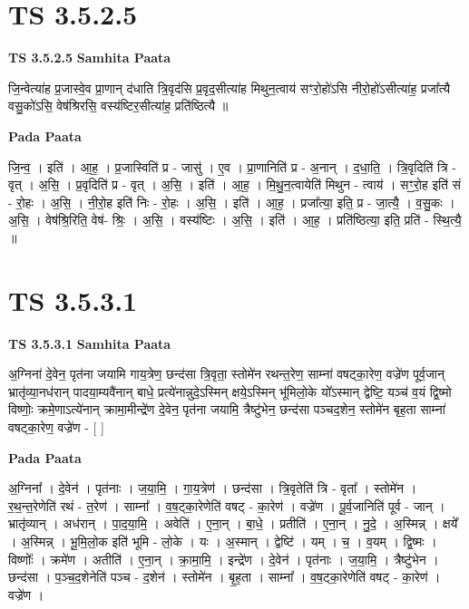 \documentclass[17pt]{extarticle}
\begin{document}
\section*{ TS 3.5.2.5 }

\textbf{TS 3.5.2.5 } \newline
\textbf{Samhita Paata} \newline

जि॒न्वेत्या॑ह प्र॒जास्वे॒व प्रा॒णान् द॑धाति त्रि॒वृद॑सि प्र॒वृद॒सीत्या॑ह मिथुन॒त्वाय॑ सꣳरो॒हो॑ऽसि नीरो॒हो॑ऽसीत्या॑ह॒ प्रजा᳚त्यै वसु॒को॑ऽसि॒ वेष॑श्रिरसि॒ वस्य॑ष्टिर॒सीत्या॑ह॒ प्रति॑ष्ठित्यै ॥ \newline

\textbf{Pada Paata} \newline

जि॒न्व॒ । इति॑ । आ॒ह॒ । प्र॒जास्विति॑ प्र - जासु॑ । ए॒व । प्रा॒णानिति॑ प्र - अ॒नान् । द॒धा॒ति॒ । त्रि॒वृदिति॑ त्रि - वृत् । अ॒सि॒ । प्र॒वृदिति॑ प्र - वृत् । अ॒सि॒ । इति॑ । आ॒ह॒ । मि॒थु॒न॒त्वायेति॑ मिथुन - त्वाय॑ । सꣳ॒॒रो॒ह इति॑ सं - रो॒हः । अ॒सि॒ । नी॒रो॒ह इति॑ निः - रो॒हः । अ॒सि॒ । इति॑ । आ॒ह॒ । प्रजा᳚त्या॒ इति॒ प्र - जा॒त्यै॒ । व॒सु॒कः । अ॒सि॒ । वेष॑श्रि॒रिति॒ वेष॑- श्रिः॒ । अ॒सि॒ । वस्य॑ष्टिः । अ॒सि॒ । इति॑ । आ॒ह॒ । प्रति॑ष्ठित्या॒ इति॒ प्रति॑ - स्थि॒त्यै॒ ॥  \newline




\section*{ TS 3.5.3.1 }

\textbf{TS 3.5.3.1 } \newline
\textbf{Samhita Paata} \newline

अ॒ग्निना॑ दे॒वेन॒ पृत॑ना जयामि गाय॒त्रेण॒ छन्द॑सा त्रि॒वृता॒ स्तोमे॑न रथन्त॒रेण॒ साम्ना॑ वषट्का॒रेण॒ वज्रे॑ण पूर्व॒जान् भ्रातृ॑व्या॒नध॑रान् पादया॒म्यवै॑नान् बाधे॒ प्रत्ये॑नान्नुदे॒ऽस्मिन् क्षये॒ऽस्मिन् भू॑मिलो॒के यो᳚ऽस्मान् द्वेष्टि॒ यञ्च॑ व॒यं द्वि॒ष्मो विष्णोः॒ क्रमे॒णाऽत्ये॑नान् क्रामा॒मीन्द्रे॑ण दे॒वेन॒ पृत॑ना जयामि॒ त्रैष्टु॑भेन॒ छन्द॑सा पञ्चद॒शेन॒ स्तोमे॑न बृह॒ता साम्ना॑ वषट्का॒रेण॒ वज्रे॑ण - [  ] \newline

\textbf{Pada Paata} \newline

अ॒ग्निना᳚ । दे॒वेन॑ । पृत॑नाः । ज॒या॒मि॒ । गा॒य॒त्रेण॑ । छन्द॑सा । त्रि॒वृतेति॑ त्रि - वृता᳚ । स्तोमे॑न । र॒थ॒न्त॒रेणेति॑ रथं - त॒रेण॑ । साम्ना᳚ । व॒ष॒ट्का॒रेणेति॑ वषट् - का॒रेण॑ । वज्रे॑ण । पू॒र्व॒जानिति॑ पूर्व - जान् । भ्रातृ॑व्यान् । अध॑रान् । पा॒द॒या॒मि॒ । अवेति॑ । ए॒ना॒न् । बा॒धे॒ । प्रतीति॑ । ए॒ना॒न् । नु॒दे॒ । अ॒स्मिन्न् । क्षये᳚ । अ॒स्मिन्न् । भू॒मि॒लो॒क इति॑ भूमि - लो॒के । यः । अ॒स्मान् । द्वेष्टि॑ । यम् । च॒ । व॒यम् । द्वि॒ष्मः । विष्णोः᳚ । क्रमे॑ण । अतीति॑ । ए॒ना॒न् । क्रा॒मा॒मि॒ । इन्द्रे॑ण । दे॒वेन॑ । पृत॑नाः । ज॒या॒मि॒ । त्रैष्टु॑भेन । छन्द॑सा । प॒ञ्च॒द॒शेनेति॑ पञ्च - द॒शेन॑ । स्तोमे॑न । बृ॒ह॒ता । साम्ना᳚ । व॒ष॒ट्का॒रेणेति॑ वषट् - का॒रेण॑ । वज्रे॑ण ।  \newline
\end{document}
